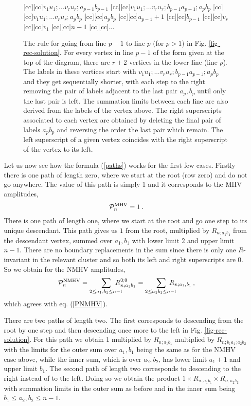 \documentclass[12pt]{article}
\def \be  {\begin{equation}}
\def \ee  {\end{equation}}
\begin{document}
{\begin{figure}
[cc][cc]{$v_{1}u_{1};\ldots v_{r}u_{r};a_{p-1}b_{p-1}$}
[cc][cc]{$v_{1}u_{1};\ldots v_{r}u_{r};b_{p-1}a_{p-1};a_{p}b_{p}$}
[cc][cc]{$v_{1}u_{1};\ldots v_{r}u_{r};a_{p}b_{p}$}
[cc][cc]{$a_{p}b_{p}$}
[cc][cc]{$a_{p-1}+1$}
[cc][cc]{$b_{p-1}$}
[cc][cc]{$v_{r}$}
[cc][cc]{$v_{1}$}
[cc][cc]{$n-1$}
[cc][cc]{$\ldots$}
 \centerline{{
}}  \caption[]{\small
  The rule for going from line $p-1$ to line $p$ (for $p>1$) in Fig. \ref{fig-rec-solution}. For every vertex in line $p-1$ of the form given at the top of the diagram, there are $r+2$ vertices in the lower line (line $p$). The labels in these vertices start with $v_{1}u_{1};\ldots v_{r}u_{r};b_{p-1}a_{p-1};a_{p}b_{p}$ and they get sequentially shorter, with each step to the right removing the pair of labels adjacent to the last pair $a_p,b_p$ until only the last pair is left. The summation limits between each line are also derived from the labels of the vertex above.
The right superscripts associated to each vertex are obtained by deleting the final pair of labels $a_pb_p$ and reversing the order the last pair which remain. The left superscript of a given vertex coincides with the right superscript of the vertex to its left.
 }
  \label{fig-generic}
\end{figure}


Let us now see how the formula (\ref{paths}) works for the first few cases. Firstly there is one path of length zero, where we start at the root (row zero) and do not go anywhere. The value of this path is simply 1 and it corresponds to the MHV amplitudes,
\be
\mathcal{P}_n^{\rm MHV} = 1\,.
\ee
There is one path of length one, where we start at the root and go one step to its unique descendant. This path gives us $1$ from the root, multiplied by $R_{n;a_1b_1}$ from the descendant vertex, summed over $a_1,b_1$ with lower limit $2$ and upper limit $n-1$. There are no boundary replacements in the sum since there is only one $R$-invariant in the relevant cluster and so both its left and right superscripts are 0. So we obtain for the NMHV amplitudes,
\be
\mathcal{P}_n^{\rm NMHV} = \sum_{2 \leq a_1,b_1 \leq n-1} \!\!\!\!\!\!\!\! R_{n;a_1b_1}^{0;0} = \sum_{2 \leq a_1b_1 \leq n-1} \!\!\!\!\!\!\!\! R_{n;a_1,b_1}\,,
\ee
which agrees with eq. (\ref{PNMHV}).

There are two paths of length two. The first corresponds to descending from the root by one step and then descending once more to the left in Fig. \ref{fig-rec-solution}. For this path we obtain $1$ multiplied by $R_{n;a_1b_1}$ multiplied by $R_{n;b_1a_1;a_2b_2}$ with the limits for the outer sum over $a_1,b_1$ being the same as for the NMHV case above, while the inner sum, which is over $a_2,b_2$, has lower limit $a_1+1$ and upper limit $b_1$. The second path of length two corresponds to descending to the right instead of to the left. Doing so we obtain the product $1 \times R_{n;a_1b_1} \times R_{n;a_2b_2}$ with summation limits in the outer sum as before and in the inner sum being $b_1 \leq a_2,b_2 \leq n-1$.

}
\end{document}
